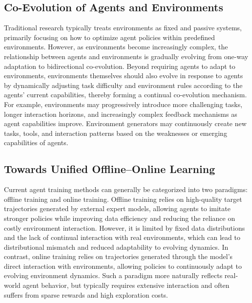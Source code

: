 \subsection{Co-Evolution of Agents and Environments}

Traditional research typically treats environments as fixed and passive systems, primarily focusing on how to optimize agent policies within predefined environments.
However, as environments become increasingly complex, the relationship between agents and environments is gradually evolving from one-way adaptation to bidirectional co-evolution.
Beyond requiring agents to adapt to environments, environments themselves should also evolve in response to agents by dynamically adjusting task difficulty and environment rules according to the agents' current capabilities, thereby forming a continual co-evolution mechanism.
For example, environments may progressively introduce more challenging tasks, longer interaction horizons, and increasingly complex feedback mechanisms as agent capabilities improve.
Environment generators may continuously create new tasks, tools, and interaction patterns based on the weaknesses or emerging capabilities of agents.

\subsection{Towards Unified Offline–Online Learning}
Current agent training methods can generally be categorized into two paradigms: offline training and online training.
Offline training relies on high-quality target trajectories generated by external expert models, allowing agents to imitate stronger policies while improving data efficiency and reducing the reliance on costly environment interaction.
However, it is limited by fixed data distributions and the lack of continual interaction with real environments, which can lead to distributional mismatch and reduced adaptability to evolving dynamics.
In contrast, online training relies on trajectories generated through the model’s direct interaction with environments, allowing policies to continuously adapt to evolving environment dynamics.
Such a paradigm more naturally reflects real-world agent behavior, but typically requires extensive interaction and often suffers from sparse rewards and high exploration costs.

